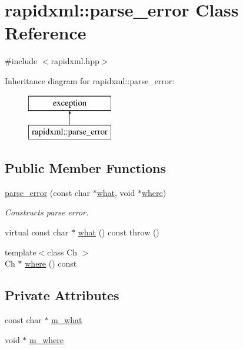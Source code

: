 \hypertarget{classrapidxml_1_1parse__error}{}\section{rapidxml\+:\+:parse\+\_\+error Class Reference}
\label{classrapidxml_1_1parse__error}


{\ttfamily \#include $<$rapidxml.\+hpp$>$}

Inheritance diagram for rapidxml\+:\+:parse\+\_\+error\+:\begin{figure}[H]
\begin{center}
\leavevmode
\includegraphics[height=2.000000cm]{classrapidxml_1_1parse__error}
\end{center}
\end{figure}
\subsection*{Public Member Functions}
\begin{DoxyCompactItemize}
\item 
\hyperlink{classrapidxml_1_1parse__error_aea12a301271c393fb627b368fb9f35c1}{parse\+\_\+error} (const char $\ast$\hyperlink{classrapidxml_1_1parse__error_a7665c88639e7466ee1de388a4f85e6fe}{what}, void $\ast$\hyperlink{classrapidxml_1_1parse__error_a3a0ab9e586c1d2b437c340f6622fbec6}{where})
\begin{DoxyCompactList}\small\item\em Constructs parse error. \end{DoxyCompactList}\item 
virtual const char $\ast$ \hyperlink{classrapidxml_1_1parse__error_a7665c88639e7466ee1de388a4f85e6fe}{what} () const   throw ()
\item 
{\footnotesize template$<$class Ch $>$ }\\Ch $\ast$ \hyperlink{classrapidxml_1_1parse__error_a3a0ab9e586c1d2b437c340f6622fbec6}{where} () const 
\end{DoxyCompactItemize}
\subsection*{Private Attributes}
\begin{DoxyCompactItemize}
\item 
const char $\ast$ \hyperlink{classrapidxml_1_1parse__error_a41bffadc72eec238cf4b7d14c10c16ca}{m\+\_\+what}
\item 
void $\ast$ \hyperlink{classrapidxml_1_1parse__error_aa5a164653ac347adddf47b264620d80f}{m\+\_\+where}
\end{DoxyCompactItemize}


